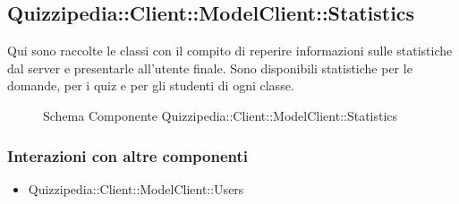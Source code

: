\subsection{Quizzipedia::Client::ModelClient::Statistics}
Qui sono raccolte le classi con il compito di reperire informazioni sulle statistiche dal server e presentarle all'utente finale. Sono disponibili statistiche per le domande, per i quiz e per gli studenti di ogni classe.
\begin{figure}[H]
\centering
\noindent{}
\caption[Schema Componente Quizzipedia::Client::ModelClient::Statistics]{Schema Componente Quizzipedia::Client::ModelClient::Statistics}
\end{figure}
\subsubsection{Interazioni con altre componenti}
\begin{itemize}
\item Quizzipedia::Client::ModelClient::Users
\end{itemize}
